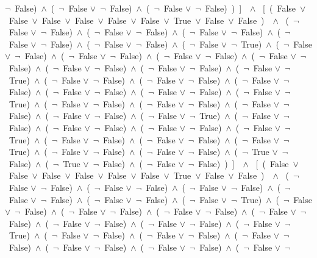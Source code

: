 ﻿\documentclass[a4paper,10pt]{article}
\begin{document}
 $\neg$\ False)\ $\wedge$\ (\  $\neg$\ False $\vee$\  $\neg$\ False)\ $\wedge$\ (\  $\neg$\ False $\vee$\  $\neg$\ False)\ )\ ]\ \ $\wedge$ \ [\ (\ False\ $\vee$\ False\ $\vee$\ False\ $\vee$\ False\ $\vee$\ False\ $\vee$\ False\ $\vee$\ True\ $\vee$\ False\ $\vee$\ False\ )\ \ $\wedge$ \ (\  $\neg$\ False $\vee$\  $\neg$\ False)\ $\wedge$\ (\  $\neg$\ False $\vee$\  $\neg$\ False)\ $\wedge$\ (\  $\neg$\ False $\vee$\  $\neg$\ False)\ $\wedge$\ (\  $\neg$\ False $\vee$\  $\neg$\ False)\ $\wedge$\ (\  $\neg$\ False $\vee$\  $\neg$\ False)\ $\wedge$\ (\  $\neg$\ False $\vee$\  $\neg$\ True)\ $\wedge$\ (\  $\neg$\ False $\vee$\  $\neg$\ False)\ $\wedge$\ (\  $\neg$\ False $\vee$\  $\neg$\ False)\ $\wedge$\ (\  $\neg$\ False $\vee$\  $\neg$\ False)\ $\wedge$\ (\  $\neg$\ False $\vee$\  $\neg$\ False)\ $\wedge$\ (\  $\neg$\ False $\vee$\  $\neg$\ False)\ $\wedge$\ (\  $\neg$\ False $\vee$\  $\neg$\ False)\ $\wedge$\ (\  $\neg$\ False $\vee$\  $\neg$\ True)\ $\wedge$\ (\  $\neg$\ False $\vee$\  $\neg$\ False)\ $\wedge$\ (\  $\neg$\ False $\vee$\  $\neg$\ False)\ $\wedge$\ (\  $\neg$\ False $\vee$\  $\neg$\ False)\ $\wedge$\ (\  $\neg$\ False $\vee$\  $\neg$\ False)\ $\wedge$\ (\  $\neg$\ False $\vee$\  $\neg$\ False)\ $\wedge$\ (\  $\neg$\ False $\vee$\  $\neg$\ True)\ $\wedge$\ (\  $\neg$\ False $\vee$\  $\neg$\ False)\ $\wedge$\ (\  $\neg$\ False $\vee$\  $\neg$\ False)\ $\wedge$\ (\  $\neg$\ False $\vee$\  $\neg$\ False)\ $\wedge$\ (\  $\neg$\ False $\vee$\  $\neg$\ False)\ $\wedge$\ (\  $\neg$\ False $\vee$\  $\neg$\ True)\ $\wedge$\ (\  $\neg$\ False $\vee$\  $\neg$\ False)\ $\wedge$\ (\  $\neg$\ False $\vee$\  $\neg$\ False)\ $\wedge$\ (\  $\neg$\ False $\vee$\  $\neg$\ False)\ $\wedge$\ (\  $\neg$\ False $\vee$\  $\neg$\ True)\ $\wedge$\ (\  $\neg$\ False $\vee$\  $\neg$\ False)\ $\wedge$\ (\  $\neg$\ False $\vee$\  $\neg$\ False)\ $\wedge$\ (\  $\neg$\ False $\vee$\  $\neg$\ True)\ $\wedge$\ (\  $\neg$\ False $\vee$\  $\neg$\ False)\ $\wedge$\ (\  $\neg$\ False $\vee$\  $\neg$\ False)\ $\wedge$\ (\  $\neg$\ True $\vee$\  $\neg$\ False)\ $\wedge$\ (\  $\neg$\ True $\vee$\  $\neg$\ False)\ $\wedge$\ (\  $\neg$\ False $\vee$\  $\neg$\ False)\ )\ ]\ \ $\wedge$ \ [\ (\ False\ $\vee$\ False\ $\vee$\ False\ $\vee$\ False\ $\vee$\ False\ $\vee$\ False\ $\vee$\ True\ $\vee$\ False\ $\vee$\ False\ )\ \ $\wedge$ \ (\  $\neg$\ False $\vee$\  $\neg$\ False)\ $\wedge$\ (\  $\neg$\ False $\vee$\  $\neg$\ False)\ $\wedge$\ (\  $\neg$\ False $\vee$\  $\neg$\ False)\ $\wedge$\ (\  $\neg$\ False $\vee$\  $\neg$\ False)\ $\wedge$\ (\  $\neg$\ False $\vee$\  $\neg$\ False)\ $\wedge$\ (\  $\neg$\ False $\vee$\  $\neg$\ True)\ $\wedge$\ (\  $\neg$\ False $\vee$\  $\neg$\ False)\ $\wedge$\ (\  $\neg$\ False $\vee$\  $\neg$\ False)\ $\wedge$\ (\  $\neg$\ False $\vee$\  $\neg$\ False)\ $\wedge$\ (\  $\neg$\ False $\vee$\  $\neg$\ False)\ $\wedge$\ (\  $\neg$\ False $\vee$\  $\neg$\ False)\ $\wedge$\ (\  $\neg$\ False $\vee$\  $\neg$\ False)\ $\wedge$\ (\  $\neg$\ False $\vee$\  $\neg$\ True)\ $\wedge$\ (\  $\neg$\ False $\vee$\  $\neg$\ False)\ $\wedge$\ (\  $\neg$\ False $\vee$\  $\neg$\ False)\ $\wedge$\ (\  $\neg$\ False $\vee$\  $\neg$\ False)\ $\wedge$\ (\  $\neg$\ False $\vee$\  $\neg$\ False)\ $\wedge$\ (\  $\neg$\ False $\vee$\  $\neg$\ False)\ $\wedge$\ (\  $\neg$\ False $\vee$\  $\neg$\ 
\end{document}
